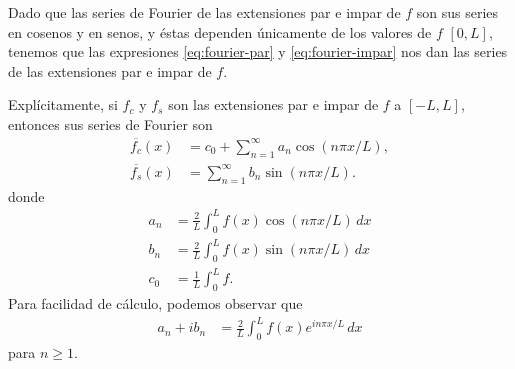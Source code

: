 \documentclass[11pt,letterpaper]{report}
\newcommand\<{\langle}
\renewcommand\>{\rangle}
\begin{document}
Dado que las series de Fourier de las extensiones par e impar de $f$
son sus series en cosenos y en senos, y éstas dependen únicamente de
los valores de $f$ $[0,L]$, tenemos que las
expresiones \eqref{eq:fourier-par} y \eqref{eq:fourier-impar}
nos dan las series de las extensiones par e impar de $f$.

Explícitamente, si $f_c$ y $f_s$ son las extensiones par e impar
de $f$ a $[-L,L]$, entonces sus series de Fourier son
\begin{align*}
  \overline{f_c}(x) &= c_0 + \sum_{n=1}^{\infty}a_n\cos(n\pi x/L), \\
  \overline{f_s}(x) &= \sum_{n=1}^{\infty}b_n\sin(n\pi x/L).
\end{align*}
donde
\begin{align*}
  a_n &= \frac{2}{L}\int_{0}^L f(x)\cos(n\pi x/L)\,dx \\
  b_n &= \frac{2}{L}\int_{0}^L f(x)\sin(n\pi x/L)\,dx \\
  c_0 &= \frac{1}{L}\int_{0}^L f.
\end{align*}
Para facilidad de cálculo, podemos observar que
\begin{align*}
  a_n+ib_n
  &= \frac{2}{L}\int_0^L f(x)e^{in\pi x/L}\,dx
\end{align*}
para $n\geq 1$.
\end{document}
